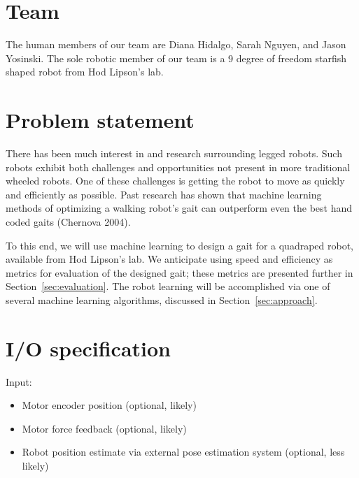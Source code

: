 \section{Team}

The human members of our team are Diana Hidalgo, Sarah Nguyen, and
Jason Yosinski.  The sole robotic member of our team is a 9 degree of
freedom starfish shaped robot from Hod Lipson's lab.



\section{Problem statement}

There has been much interest in and research surrounding legged
robots.  Such robots exhibit both challenges and opportunities not
present in more traditional wheeled robots.  One of these challenges
is getting the robot to move as quickly and efficiently as possible.
Past research has shown that machine learning methods of optimizing a
walking robot's gait can outperform even the best hand coded gaits
(Chernova 2004).

To this end, we will use machine learning to design a gait for a
quadraped robot, available from Hod Lipson's lab.  We anticipate using
speed and efficiency as metrics for evaluation of the designed gait;
these metrics are presented further in Section~\ref{sec:evaluation}.
The robot learning will be accomplished via one of several machine
learning algorithms, discussed in Section~\ref{sec:approach}.




\section{I/O specification}


Input:

\begin{itemize}
\item Motor encoder position (optional, likely)
\item Motor force feedback (optional, likely)
\item Robot position estimate via external pose estimation system (optional, less likely)
\end{itemize}

